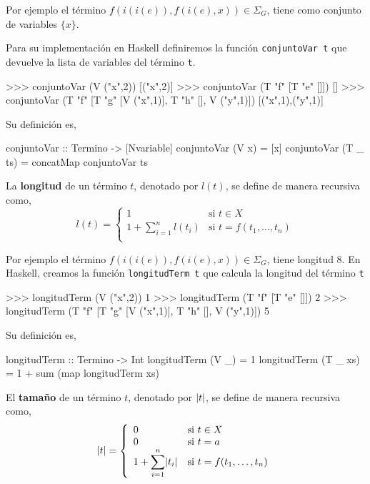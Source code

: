 Por ejemplo el término $f(i(i(e)),f(i(e),x)) \in \Sigma_G$, tiene como
conjunto de variables $\{x\}$.  

Para su implementación en Haskell definiremos la función
\texttt{conjuntoVar t} que devuelve la lista de variables del término
\texttt{t}.

\begin{sesion}
>>> conjuntoVar (V ("x",2))
[("x",2)]
>>> conjuntoVar (T "f" [T "e" []])
[]
>>> conjuntoVar (T "f" [T "g" [V ("x",1)], T "h" [], V ("y",1)])
[("x",1),("y",1)]
\end{sesion}

Su definición es,

\begin{codigo}
conjuntoVar :: Termino -> [Nvariable]
conjuntoVar (V x)    = [x]
conjuntoVar (T _ ts) = concatMap conjuntoVar ts
\end{codigo}

\begin{defi} La \textbf{longitud} de un término $t$, denotado por $l(t)$, se
  define de manera recursiva como,
  \begin{equation*}
    l(t)=
    \left\lbrace
      \begin{array}{ll}
        1 & \text{si } t \in X \\
        1 + \displaystyle \sum^n_{i=1} l(t_i) & \text{si } t = f(t_1, \dots, t_n)\\
      \end{array}
    \right.
  \end{equation*}
\end{defi}

Por ejemplo el término $f(i(i(e)),f(i(e),x)) \in \Sigma_G$, tiene
longitud 8.  
En Haskell, creamos la función \texttt{longitudTerm t} que
calcula la longitud del término \texttt{t}

\begin{sesion}
>>> longitudTerm (V ("x",2))
1
>>> longitudTerm (T "f" [T "e" []])
2
>>> longitudTerm (T "f" [T "g" [V ("x",1)], T "h" [], V ("y",1)])
5
\end{sesion}

Su definición es,

\begin{codigo}
longitudTerm :: Termino -> Int
longitudTerm (V _)    = 1
longitudTerm (T _ xs) = 1 + sum (map longitudTerm xs)
\end{codigo}

\begin{defi} El \textbf{tamaño} de un término $t$, denotado por $\lvert t\rvert $, se
  define de manera recursiva como,
  \begin{equation*}
    \lvert t\rvert=
    \left\lbrace
      \begin{array}{ll}
        0 & \text{si } t \in X \\
        0 & \text{si } t = a \\
        1 + \displaystyle \sum^n_{i=1} \lvert t_i\rvert & \text{si } t = f(t_1, \dots, t_n)\\
      \end{array}
    \right.
  \end{equation*}
\end{defi}

